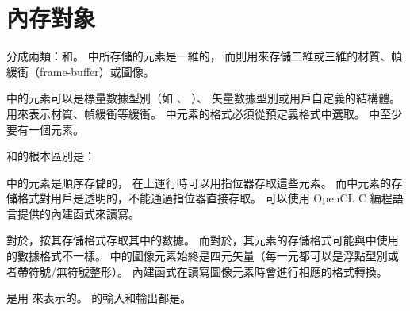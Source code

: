 \section{內存對象}

分成兩類：和。
中所存儲的元素是一維的，
而則用來存儲二維或三維的材質、幀緩衝（frame-buffer）或圖像。

中的元素可以是標量數據型別（如 、 ）、
矢量數據型別或用戶自定義的結構體。
用來表示材質、幀緩衝等緩衝。
中元素的格式必須從預定義格式中選取。
中至少要有一個元素。

和的根本區別是：
\startigBase
\item {}中的元素是順序存儲的，
在上運行時可以用指位器存取這些元素。
而中元素的存儲格式對用戶是透明的，不能通過指位器直接存取。
可以使用 OpenCL C 編程語言提供的內建函式來讀寫。

\item 對於，按其存儲格式存取其中的數據。
而對於，其元素的存儲格式可能與中使用的數據格式不一樣。
中的圖像元素始終是四元矢量（每一元都可以是浮點型別或者帶符號/無符號整形）。
內建函式在讀寫圖像元素時會進行相應的格式轉換。
\stopigBase

是用  來表示的。
的輸入和輸出都是。

